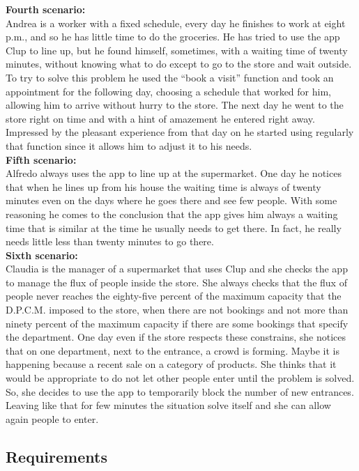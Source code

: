 \textbf{Fourth scenario:}\\
Andrea is a worker with a fixed schedule, every day he finishes to work at eight p.m., and so he has little time to do the groceries. He has tried to use the app Clup to line up, but he found himself, sometimes, with a waiting time of twenty minutes, without knowing what to do except to go to the store and wait outside. To try to solve this problem he used the “book a visit” function and took an appointment for the following day, choosing a schedule that worked for him, allowing him to arrive without hurry to the store. The next day he went to the store right on time and with a hint of amazement he entered right away. Impressed by the pleasant experience from that day on he started using regularly that function since it allows him to adjust it to his needs.\\


\textbf{Fifth scenario:}\\
Alfredo always uses the app to line up at the supermarket. One day he notices that when he lines up from his house the waiting time is always of twenty minutes even on the days where he goes there and see few people. With some reasoning he comes to the conclusion that the app gives him always a waiting time that is similar at the time he usually needs to get there. In fact, he really needs little less than twenty minutes to go there.\\


\textbf{Sixth scenario:}\\
Claudia is the manager of a supermarket that uses Clup and she checks the app to manage the flux of people inside the store. She always checks that the flux of people never reaches the eighty-five percent of the maximum capacity that the D.P.C.M. imposed to the store, when there are not bookings and not more than ninety percent of the maximum capacity if there are some bookings that specify the department. 
One day even if the store respects these constrains, she notices that on one department, next to the entrance, a crowd is forming. Maybe it is happening because a recent sale on a category of products. She thinks that it would be appropriate to do not let other people enter until the problem is solved. So, she decides to use the app to temporarily block the number of new entrances. Leaving like that for few minutes the situation solve itself and she can allow again people to enter.\\


\subsection{Requirements}

